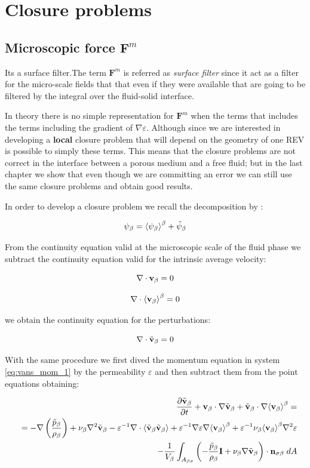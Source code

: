 \section{Closure problems}


\subsection{Microscopic force $\mathbf{F}^m$}
Its a surface filter.The term $\mathbf{F}^m$ is referred as \textit{surface filter} since it act as a filter for the micro-scale fields that that even if they were available that are going to be filtered by the integral over the fluid-solid interface.

In theory there is no simple representation for $\mathbf{F}^m$ when the terms that includes the terms including the gradient of $\nabla \varepsilon$.
Although since we are interested in developing a \textbf{local} closure problem that will depend on the geometry of one REV is possible to simply these terms.
This means that the closure problems are not correct in the interface between a porous medium and a free fluid; but in the last chapter we show that even though we are committing an error we can still use the same closure problems and obtain good results.

In order to develop a closure problem we recall the decomposition by \citet{gray1975derivation}:

\begin{equation}
\psi_{\beta} = {\left< \psi_{\beta} \right>}^{\beta} + \tilde{\psi}_{\beta}
\end{equation}

From the continuity equation valid at the microscopic scale of the fluid phase we subtract the continuity equation valid for the intrinsic average velocity:

$$
\nabla \cdot  \textbf{v}_{\beta}  = 0
$$

$$
\nabla \cdot  {\left< \textbf{v}_{\beta}\right>}^{\beta}  = 0 
$$

we obtain the continuity equation for the perturbations:

\begin{equation}
\nabla \cdot \tilde{\textbf{v}}_{\beta} = 0 
\end{equation}


With the same procedure we first dived the momentum equation in system \ref{eq:vans_mom_1} by the permeability $\varepsilon$ and then subtract them from the point equations obtaining:

\begin{eqnarray}
&&  \dfrac{\partial \tilde{\textbf{v}}_{\beta}}{\partial t} + \textbf{v}_{\beta} \cdot \nabla \tilde{\textbf{v}}_{\beta} + \tilde{\textbf{v}}_{\beta} \cdot \nabla {\left< \textbf{v}_{\beta}\right>}^{\beta}  = \nonumber \\
&&= -\nabla \left(\dfrac{\tilde{p}_{\beta}}{\rho_{\beta}}\right) + \nu_{\beta} \nabla^2 \tilde{\textbf{v}}_{\beta} - \varepsilon^{-1}\nabla \cdot  {\left< \tilde{\textbf{v}}_{\beta}\tilde{\textbf{v}}_{\beta}\right>} +  \varepsilon^{-1} \nabla \varepsilon \nabla {\left< \textbf{v}_{\beta}\right>}^{\beta} + \varepsilon^{-1} \nu_{\beta} {\left< \textbf{v}_{\beta} \right>}^{\beta} \nabla^2 \varepsilon \nonumber \\
&&- \dfrac{1}{V_\beta} \displaystyle\int_{A_{\beta \sigma}} \left(-\dfrac{\tilde{p}_{\beta}}{\rho_{\beta}} \mathbf{I}  + \nu_{\beta} \nabla \tilde{\textbf{v}}_{\beta} \right) \cdot \mathbf{n}_{\sigma \beta} \;dA
\label{eq:vans_mom_3}
\end{eqnarray}

